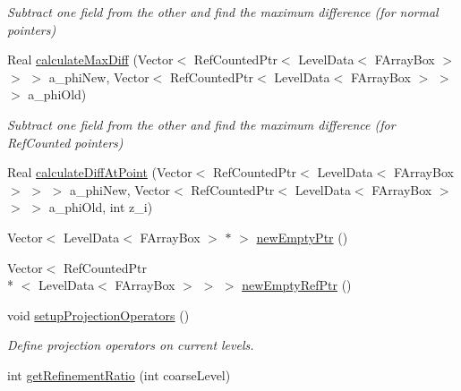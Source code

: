 \begin{DoxyCompactItemize}
\begin{DoxyCompactList}\small\item\em Subtract one field from the other and find the maximum difference (for normal pointers) \end{DoxyCompactList}\item 
\hypertarget{classamr_mushy_layer_a4813a89202d3fed9b4d164bb258c9903}{Real \hyperlink{classamr_mushy_layer_a4813a89202d3fed9b4d164bb258c9903}{calculate\-Max\-Diff} (Vector$<$ Ref\-Counted\-Ptr$<$ Level\-Data$<$ F\-Array\-Box $>$ $>$ $>$ a\-\_\-phi\-New, Vector$<$ Ref\-Counted\-Ptr$<$ Level\-Data$<$ F\-Array\-Box $>$ $>$ $>$ a\-\_\-phi\-Old)}\label{classamr_mushy_layer_a4813a89202d3fed9b4d164bb258c9903}

\begin{DoxyCompactList}\small\item\em Subtract one field from the other and find the maximum difference (for Ref\-Counted pointers) \end{DoxyCompactList}\item 
Real \hyperlink{classamr_mushy_layer_affbab962771336f6361fe092ca6f3810}{calculate\-Diff\-At\-Point} (Vector$<$ Ref\-Counted\-Ptr$<$ Level\-Data$<$ F\-Array\-Box $>$ $>$ $>$ a\-\_\-phi\-New, Vector$<$ Ref\-Counted\-Ptr$<$ Level\-Data$<$ F\-Array\-Box $>$ $>$ $>$ a\-\_\-phi\-Old, int z\-\_\-i)
\item 
Vector$<$ Level\-Data$<$ F\-Array\-Box $>$ $\ast$ $>$ \hyperlink{classamr_mushy_layer_a88d1d5e4f6172ce81f4fcc8cf225ed13}{new\-Empty\-Ptr} ()
\item 
Vector$<$ Ref\-Counted\-Ptr\\*
$<$ Level\-Data$<$ F\-Array\-Box $>$ $>$ $>$ \hyperlink{classamr_mushy_layer_a454bb00da5ae0a5043c2e8372bf943f5}{new\-Empty\-Ref\-Ptr} ()
\item 
\hypertarget{classamr_mushy_layer_a8cf2560b9789b5cf972fd782efa7ef6f}{void \hyperlink{classamr_mushy_layer_a8cf2560b9789b5cf972fd782efa7ef6f}{setup\-Projection\-Operators} ()}\label{classamr_mushy_layer_a8cf2560b9789b5cf972fd782efa7ef6f}

\begin{DoxyCompactList}\small\item\em Define projection operators on current levels. \end{DoxyCompactList}\item 
\hypertarget{classamr_mushy_layer_a3d65ea9364f2a2c9fcf34275770d63f3}{int \hyperlink{classamr_mushy_layer_a3d65ea9364f2a2c9fcf34275770d63f3}{get\-Refinement\-Ratio} (int coarse\-Level)}\label{classamr_mushy_layer_a3d65ea9364f2a2c9fcf34275770d63f3}


\end{DoxyCompactItemize}
